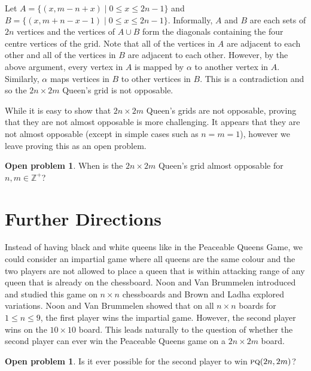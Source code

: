 \documentclass[11pt]{article}
\theoremstyle{definition}
\newtheorem{problem}[theorem]{Open problem}
\begin{document}
Let $A = \{(x, m-n+x) \mid 0\leq x\leq 2n-1\}$ and $B= \{(x, m+n-x-1) \mid
0\leq x\leq 2n-1\}$. Informally, $A$ and $B$ are each sets of $2n$ vertices and
the vertices of $A\cup B$ form the diagonals containing the four centre
vertices of the grid. Note that all of the vertices in $A$ are adjacent to each
other and all of the vertices in $B$ are adjacent to each other. However, by
the above argument, every vertex in $A$ is mapped by $\alpha$ to another vertex
in $A$. Similarly, $\alpha$ maps vertices in $B$ to other vertices in $B$. This
is a contradiction and so the $2n \times 2m$ Queen's grid is not opposable.

While it is easy to show that $2n \times 2m$ Queen's grids are not opposable,
proving that they are not almost opposable is more challenging. It appears that
they are not almost opposable (except in simple cases such as $n=m=1$), however
we leave proving this as an open problem.

\begin{problem}
    When is the $2n \times 2m$ Queen's grid almost opposable for $n,m \in
    \mathbb{Z}^+$?
\end{problem}

\section{Further Directions}
\label{sec: further directions}

Instead of having black and white queens like in the Peaceable Queens Game, we
could consider an impartial game where all queens are the same colour and the
two players are not allowed to place a queen that is within attacking range of
any queen that is already on the chessboard. Noon and Van Brummelen
\cite{noon:surreal, noon.van-brummelen:non-attacking} introduced and studied
this game on $n\times n$ chessboards and Brown and Ladha
\cite{brown.ladha:exploring} explored variations. Noon and Van Brummelen
\cite{noon:surreal, noon.van-brummelen:non-attacking} showed that on all
$n\times n$ boards for $1\leq n\leq 9$, the first player wins the impartial
game. However, the second player wins on the $10\times 10$ board. This leads
naturally to the question of whether the second player can ever win the
Peaceable Queens game on a $2n \times 2m$ board.

\begin{problem}
    Is it ever possible for the second player to win $\textsc{pq}(2n,2m)$?
\end{problem}
\end{document}
